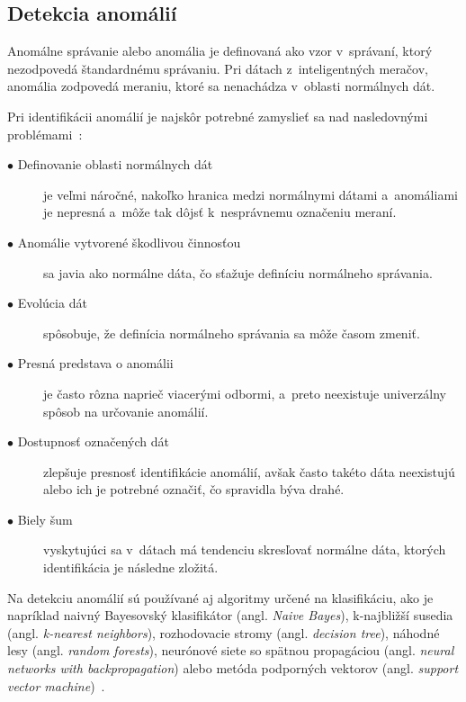 \documentclass[a4paper,twoside,slovak,12pt,appendix]{article}
\begin{document}

\subsection{Detekcia anomálií}
Anomálne správanie alebo anomália je definovaná ako vzor v~správaní, ktorý
nezodpovedá štandardnému správaniu. Pri dátach z~inteligentných meračov,
anomália zodpovedá meraniu, ktoré sa nenachádza v~oblasti normálnych dát.

Pri identifikácii anomálií je najskôr potrebné zamyslieť sa nad nasledovnými
problémami~\cite{Chandola2009}:
\begin{description}
	\item[$\bullet$ Definovanie oblasti normálnych dát] je veľmi náročné, nakoľko
	hranica medzi normálnymi dátami a~anomáliami je nepresná a~môže tak dôjsť
	k~nesprávnemu označeniu meraní.
	\item[$\bullet$ Anomálie vytvorené škodlivou činnosťou] sa javia ako normálne
	dáta, čo sťažuje definíciu normálneho správania.
	\item[$\bullet$ Evolúcia dát] spôsobuje, že definícia normálneho správania sa
	môže časom zmeniť.
	\item[$\bullet$ Presná predstava o anomálii] je často rôzna naprieč viacerými
	odbormi, a~preto neexistuje univerzálny spôsob na určovanie anomálií.
	\item[$\bullet$ Dostupnosť označených dát] zlepšuje presnosť identifikácie
	anomálií, avšak často takéto dáta neexistujú alebo ich je potrebné označiť,
	čo spravidla býva drahé.
	\item[$\bullet$ Biely šum] vyskytujúci sa v~dátach má tendenciu skresľovať
	normálne dáta, ktorých identifikácia je následne zložitá.
\end{description}

Na detekciu anomálií sú používané aj algoritmy určené na klasifikáciu, ako je
napríklad naivný Bayesovský klasifikátor (angl. \textit{Naive Bayes}),
k-najbližší susedia (angl. \textit{k-nearest neighbors}), rozhodovacie stromy
(angl. \textit{decision tree}), náhodné lesy (angl. \textit{random forests}),
neurónové siete so spätnou propagáciou (angl. \textit{neural networks with
backpropagation}) alebo metóda podporných vektorov (angl. \textit{support vector
machine})~\cite{Coma-Puig2016}.
\end{document}
